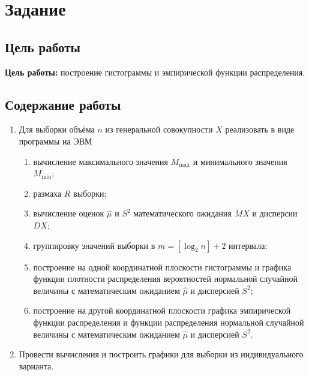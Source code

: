 \chapter{Задание}
\section{Цель работы}
\textbf{Цель работы:} построение гистограммы и эмпирической функции распределения.
\section{Содержание работы}
\begin{enumerate}
	\item Для выборки объёма $n$ из генеральной совокупности $X$ реализовать в виде программы на ЭВМ
	\begin{enumerate}
		\item вычисление максимального значения $M_{\max}$ и минимального значения $M_{\min}$;
		\item размаха $R$ выборки;
		\item вычисление оценок $\hat\mu$ и $S^2$ математического ожидания $MX$ и дисперсии $DX$;
		\item группировку значений выборки в $m = [\log_2 n] + 2$ интервала;
		\item построение на одной координатной плоскости гистограммы и графика функции плотности распределения вероятностей нормальной случайной величины с математическим ожиданием $\hat{\mu}$ и дисперсией $S^2$;
		\item построение на другой координатной плоскости графика эмпирической функции распределения и функции распределения нормальной случайной величины с математическим ожиданием $\hat{\mu}$ и дисперсией $S^2$.
	\end{enumerate}
	\item Провести вычисления и построить графики для выборки из индивидуального варианта.
\end{enumerate}